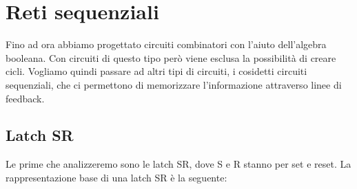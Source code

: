 \chapter{Reti sequenziali}
Fino ad ora abbiamo progettato circuiti combinatori con l'aiuto dell'algebra booleana. Con circuiti di questo tipo però viene esclusa la possibilità di creare cicli.
Vogliamo quindi passare ad altri tipi di circuiti, i cosidetti circuiti sequenziali, che ci permettono di memorizzare l'informazione attraverso linee di feedback.

\section{Latch SR}
Le prime che analizzeremo sono le latch SR, dove S e R stanno per set e reset.
La rappresentazione base di una latch SR è la seguente:

\begin{center}
\end{center}

